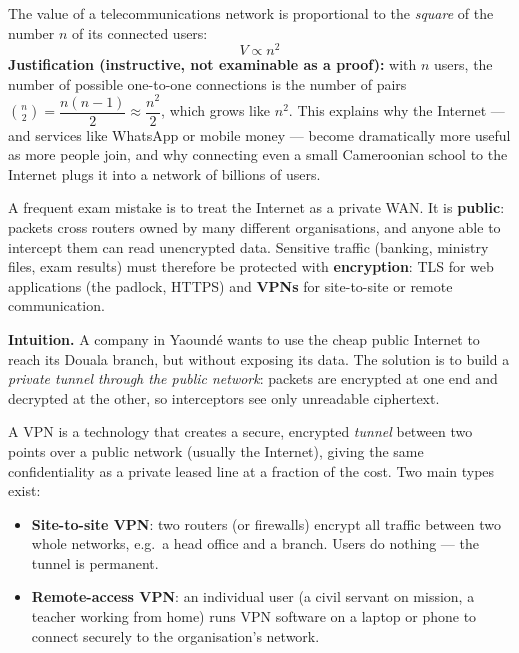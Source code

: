 \documentclass[11pt]{article}
\newcommand{\cle}[1]{{\popxbold\color{popdark}#1}}
\newcounter{popsec}
\newcounter{popsub}
\newcommand{\courssub}[1]{%
  \stepcounter{popsub}%
  \par\vspace{9pt}\noindent{\popxbold\fontsize{11.5}{13}\selectfont\color{popink}{\color{poporange}\thepopsec.\thepopsub}\hspace{6pt}#1}\par\nopagebreak\vspace{4pt}
}
\begin{document}
\begin{propriete}
The value of a telecommunications network is proportional to the \emph{square} of the number $n$ of its connected users:
\[ V \propto n^2 \]
\textbf{Justification (instructive, not examinable as a proof):} with $n$ users, the number of possible one-to-one connections is the number of pairs $\binom{n}{2} = \dfrac{n(n-1)}{2} \approx \dfrac{n^2}{2}$, which grows like $n^2$. This explains why the Internet — and services like WhatsApp or mobile money — become dramatically more useful as more people join, and why connecting even a small Cameroonian school to the Internet plugs it into a network of billions of users.
\end{propriete}

\begin{attention}
A frequent exam mistake is to treat the Internet as a private WAN. It is \textbf{public}: packets cross routers owned by many different organisations, and anyone able to intercept them can read unencrypted data. Sensitive traffic (banking, ministry files, exam results) must therefore be protected with \textbf{encryption}: TLS for web applications (the padlock, HTTPS) and \textbf{VPNs} for site-to-site or remote communication.
\end{attention}

\courssub{Virtual Private Networks (VPN)}

\textbf{Intuition.} A company in Yaoundé wants to use the cheap public Internet to reach its Douala branch, but without exposing its data. The solution is to build a \emph{private tunnel through the public network}: packets are encrypted at one end and decrypted at the other, so interceptors see only unreadable ciphertext.

\begin{definition}
A \cle{VPN} is a technology that creates a secure, encrypted \emph{tunnel} between two points over a public network (usually the Internet), giving the same confidentiality as a private leased line at a fraction of the cost. Two main types exist:
\begin{itemize}
\item \textbf{Site-to-site VPN}: two routers (or firewalls) encrypt all traffic between two whole networks, e.g.\ a head office and a branch. Users do nothing — the tunnel is permanent.
\item \textbf{Remote-access VPN}: an individual user (a civil servant on mission, a teacher working from home) runs VPN software on a laptop or phone to connect securely to the organisation's network.
\end{itemize}
\end{definition}
\end{document}

